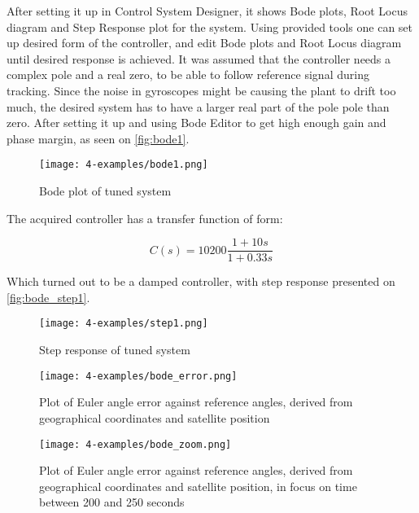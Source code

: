         After setting it up in Control System Designer, it shows Bode plots, Root Locus diagram and Step Response plot for the system. Using provided tools one can set up desired form of the controller, and edit Bode plots and Root Locus diagram until desired response is achieved. It was assumed that the controller needs a complex pole and a real zero, to be able to follow reference signal during tracking. Since the noise in gyroscopes might be causing the plant to drift too much, the desired system has to have a larger real part of the pole pole than zero. After setting it up and using Bode Editor to get high enough gain and phase margin, as seen on \autoref{fig:bode1}.

        \begin{figure}[H]
            \centering
            \texttt{[image: 4-examples/bode1.png]}
            \caption{Bode plot of tuned system}
            \label{fig:bode1}
        \end{figure}

        The acquired controller has a transfer function of form:
        
        \begin{equation}
            C(s)=10200\frac{1+10s}{1+0.33s}
        \end{equation}

        Which turned out to be a damped controller, with step response presented on \autoref{fig:bode_step1}.

        \begin{figure}[H]
            \centering
            \texttt{[image: 4-examples/step1.png]}
            \caption{Step response of tuned system}
            \label{fig:bode_step1}
        \end{figure}
                         
        \begin{figure}[H]
            \centering
            \texttt{[image: 4-examples/bode\_error.png]}
            \caption{Plot of Euler angle error against reference angles, derived from geographical coordinates and satellite position}
            \label{fig:bode_error}
        \end{figure}
                     
        \begin{figure}[H]
            \centering
            \texttt{[image: 4-examples/bode\_zoom.png]}
            \caption{Plot of Euler angle error against reference angles, derived from geographical coordinates and satellite position, in focus on time between 200 and 250 seconds}
            \label{fig:bode_zoom}
        \end{figure}
        
